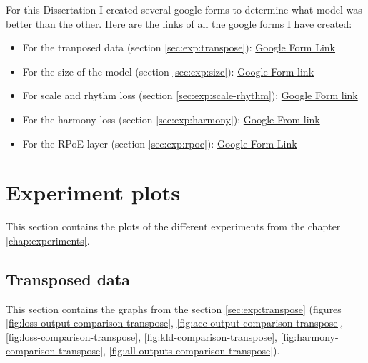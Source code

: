 \documentclass[12pt]{report}
\begin{document}
For this Dissertation I created several google forms to determine what model was better than the other.
Here are the links of all the google forms I have created:
\begin{itemize}
    \item For the tranposed data (section \ref{sec:exp:transpose}): \href{https://docs.google.com/forms/d/e/1FAIpQLSe3LEiDZFI9Y58OgWvHwKke4k1_2yPg8eJLQFBasSKUAdh3Ng/viewform?usp=sf_link}{Google Form Link}
    \item For the size of the model (section \ref{sec:exp:size}):  \href{https://forms.gle/BdEcYZgYWXPigSdA6}{Google Form link}
    \item For scale and rhythm loss (section \ref{sec:exp:scale-rhythm}): \href{https://docs.google.com/forms/d/e/1FAIpQLSckCvIg1mZdXlh1fSv_yG68dEbfQRN-WwkGG2KVdcjQ4rQgbw/viewform?usp=sf_link}{Google Form link}
    \item For the harmony loss (section \ref{sec:exp:harmony}): \href{https://docs.google.com/forms/d/e/1FAIpQLScZ1ZAkCxwIRiuewNlDUFgZcpEY2O-Yg0T8IEQzp4k9_BCCJg/viewform?usp=sf_link}{Google From link}
    \item For the RPoE layer (section \ref{sec:exp:rpoe}): \href{https://docs.google.com/forms/d/e/1FAIpQLSf1tkCLj78u-IoMYjGWa3iTYWIT_gbPnGIShjFox4whfhkjLw/viewform?usp=sf_link}{Google Form Link}
\end{itemize}

\section{Experiment plots}
\label{appendix:exp}

This section contains the plots of the different experiments from the chapter \ref{chap:experiments}.

\subsection{Transposed data}
\label{appendix:transpose}

This section contains the graphs from the section \ref{sec:exp:transpose} (figures \ref{fig:loss-output-comparison-transpose}, \ref{fig:acc-output-comparison-transpose}, \ref{fig:loss-comparison-transpose}, \ref{fig:kld-comparison-transpose}, \ref{fig:harmony-comparison-transpose}, \ref{fig:all-outputs-comparison-transpose}).
\end{document}
